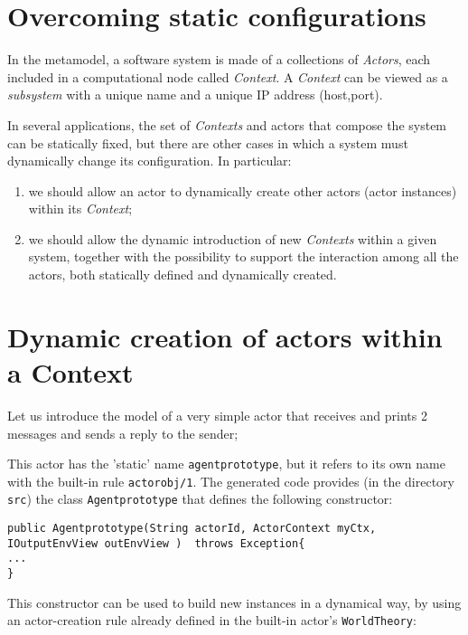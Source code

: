 \section{Overcoming static configurations}
In the \qa{} metamodel, a software system is made of a collections of \textit{Actors}, each included in a computational node called \textit{Context}. A \textit{Context} can be viewed as a \textit{subsystem} with a unique name and a unique IP address (host,port).

In several applications, the set of \textit{Contexts} and actors that compose the system can be statically fixed, but there are other cases in which a system must dynamically change its configuration. In particular:

\begin{enumerate}
\item we should allow an actor to dynamically create other actors (actor instances) within its \textit{Context};
\item we should allow the dynamic introduction of new \textit{Contexts} within a given system, together with the possibility to support the interaction among all the actors, both statically defined and dynamically created.
\end{enumerate}


\section{Dynamic creation of actors within a Context}
Let us introduce the model of a very simple actor that receives and prints 2 messages and sends a reply to the sender;
 


This actor has the 'static' name \texttt{agentprototype}, but it refers to its own name with the built-in rule \texttt{actorobj/1}. The generated code provides (in the directory \texttt{src}) the class \texttt{Agentprototype} that defines the following constructor:

\begin{Verbatim}[fontsize=\scriptsize, frame=single , label=Constrcutor in class \textit{it.unibo.agentprototype.Agentprototype}]
public Agentprototype(String actorId, ActorContext myCtx, IOutputEnvView outEnvView )  throws Exception{
...
} 
\end{Verbatim}

This constructor can be used to build new instances in a dynamical way, by using an actor-creation rule already defined in the built-in actor's \texttt{WorldTheory}:

